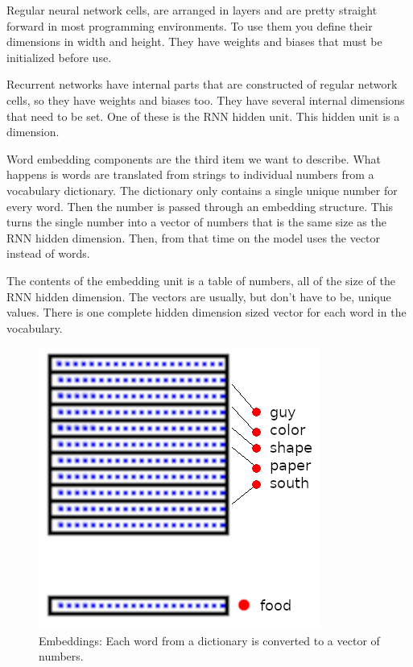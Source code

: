 Regular neural network cells, are arranged in layers and are pretty
straight forward in most programming environments. To use them you
define their dimensions in width and height. They have weights and
biases that must be initialized before use.

Recurrent networks have internal parts that are constructed of regular
network cells, so they have weights and biases too. They have several
internal dimensions that need to be set. One of these is the RNN hidden
unit. This hidden unit is a dimension.

Word embedding components are the third item we want to describe.
What happens is words are translated from strings to individual numbers
from a vocabulary dictionary. The dictionary only contains a single
unique number for every word. Then the number is passed through an
embedding structure. This turns the single number into a vector of
numbers that is the same size as the RNN hidden dimension. Then, from
that time on the model uses the vector instead of words.

The contents of the embedding unit is a table of numbers, all of the
size of the RNN hidden dimension. The vectors are usually, but don\textquoteright t
have to be, unique values. There is one complete hidden dimension
sized vector for each word in the vocabulary. 

\begin{figure}[H]
	\begin{center}
	\includegraphics[scale=0.5]{diagram-embedding}
	
	
\end{center}
	\caption[Word Embeddings]{Embeddings: Each word from a dictionary is converted to a vector of numbers.}
	
\end{figure}

